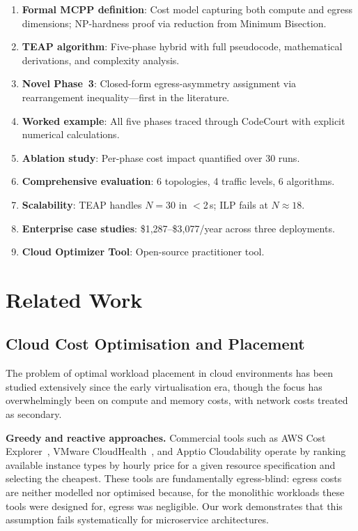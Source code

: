 \documentclass[sigconf,10pt]{acmart}
\begin{document}
\begin{enumerate}[leftmargin=*,noitemsep]
  \item \textbf{Formal MCPP definition}: Cost model capturing both compute and egress
    dimensions; NP-hardness proof via reduction from Minimum Bisection.
  \item \textbf{TEAP algorithm}: Five-phase hybrid with full pseudocode, mathematical
    derivations, and complexity analysis.
  \item \textbf{Novel Phase~3}: Closed-form egress-asymmetry assignment via
    rearrangement inequality---first in the literature.
  \item \textbf{Worked example}: All five phases traced through CodeCourt with
    explicit numerical calculations.
  \item \textbf{Ablation study}: Per-phase cost impact quantified over 30 runs.
  \item \textbf{Comprehensive evaluation}: 6 topologies, 4 traffic levels, 6 algorithms.
  \item \textbf{Scalability}: TEAP handles $N=30$ in $<$2\,s; ILP fails at $N \approx 18$.
  \item \textbf{Enterprise case studies}: \$1,287--\$3,077/year across three deployments.
  \item \textbf{Cloud Optimizer Tool}: Open-source practitioner tool.
\end{enumerate}

\section{Related Work}\label{sec:related}

\subsection{Cloud Cost Optimisation and Placement}

The problem of optimal workload placement in cloud environments has been studied
extensively since the early virtualisation era, though the focus has overwhelmingly
been on compute and memory costs, with network costs treated as secondary.

\textbf{Greedy and reactive approaches.}
Commercial tools such as AWS Cost Explorer~\cite{aws_pricing}, VMware
CloudHealth~\cite{cloudhealth}, and Apptio Cloudability operate by ranking available
instance types by hourly price for a given resource specification and selecting the
cheapest.
These tools are fundamentally egress-blind: egress costs are neither modelled nor
optimised because, for the monolithic workloads these tools were designed for, egress
was negligible.
Our work demonstrates that this assumption fails systematically for microservice
architectures.
\end{document}
